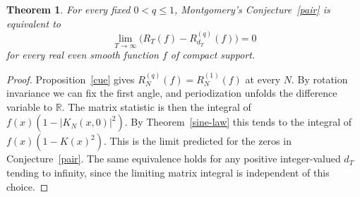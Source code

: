 \documentclass[11pt,a4paper]{article}
\newtheorem{thm}{Theorem}[section]
\begin{document}
\begin{samepage}
\begin{thm}\label{deformed-pairs}
For every fixed $0<q\leq1$, Montgomery's Conjecture~\textup{\ref{pair}} is equivalent to
\[
 \lim_{T\to\infty}\big(R_T(f)-R_{d_T}^{(q)}(f)\big)=0
\]
for every real even smooth function $f$ of compact support.
\end{thm}
\end{samepage}
\begin{proof}
Proposition~\ref{cue} gives $R_N^{(q)}(f)=R_N^{(1)}(f)$ at every $N$. By rotation invariance we can fix the first angle, and periodization unfolds the difference variable to $\mathbb R$. The matrix statistic is then the integral of $f(x)(1-|K_N(x,0)|^2)$. By Theorem~\ref{sine-law} this tends to the integral of $f(x)(1-K(x)^2)$. This is the limit predicted for the zeros in Conjecture~\ref{pair}. The same equivalence holds for any positive integer-valued $d_T$ tending to infinity, since the limiting matrix integral is independent of this choice.
\end{proof}
\end{document}
